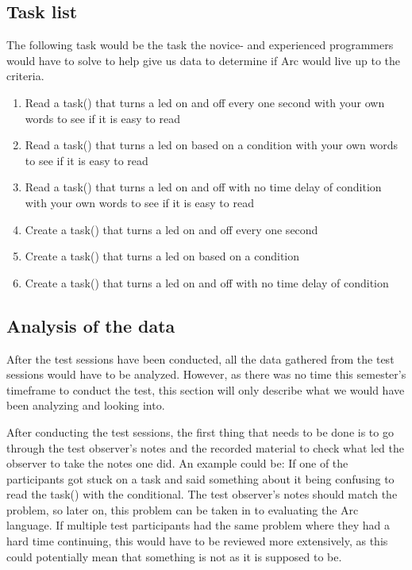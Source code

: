 \subsection{Task list}\label{subsubsec:taskList}
The following task would be the task the novice- and experienced programmers would have to solve to help give us data to determine if Arc would live up to the criteria.
\begin{enumerate} %
    \item Read a task() that turns a led on and off every one second with your own words to see if it is easy to read
    \item Read a task() that turns a led on based on a condition with your own words to see if it is easy to read
    \item Read a task() that turns a led on and off with no time delay of condition with your own words to see if it is easy to read
    \item Create a task() that turns a led on and off every one second
    \item Create a task() that turns a led on based on a condition
    \item Create a task() that turns a led on and off with no time delay of condition
\end{enumerate}

\subsection{Analysis of the data}\label{subsubsec:analysisOfTheData}
After the test sessions have been conducted, all the data gathered from the test sessions would have to be analyzed. However, as there was no time this semester's timeframe to conduct the test, this section will only describe what we would have been analyzing and looking into.

After conducting the test sessions, the first thing that needs to be done is to go through the test observer's notes and the recorded material to check what led the observer to take the notes one did. An example could be: If one of the participants got stuck on a task and said something about it being confusing to read the task() with the conditional. The test observer's notes should match the problem, so later on, this problem can be taken in to evaluating the Arc language. If multiple test participants had the same problem where they had a hard time continuing, this would have to be reviewed more extensively, as this could potentially mean that something is not as it is supposed to be.

